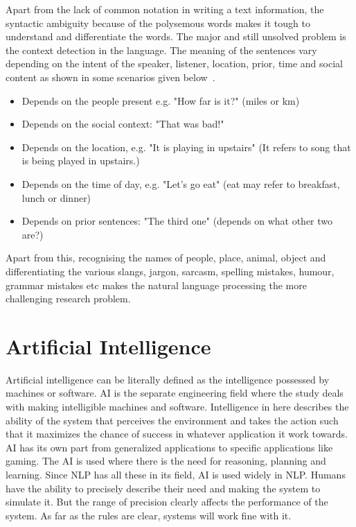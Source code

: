 \documentclass{bmcart}
\begin{document}
Apart from the lack of common notation in writing a text information, the syntactic ambiguity because of the polysemous words makes it tough to understand and differentiate the words. The major and still unsolved problem is the context detection in the language. The meaning of the sentences vary depending on the intent of the speaker, listener, location, prior, time and social content as shown in some scenarios given below~\cite{nlpHard}.

\begin{itemize}
\item     Depends on the people present e.g. "How far is it?" (miles or km)
\item     Depends on the social context: "That was bad!"
\item    Depends on the location, e.g. "It is playing in upstairs" (It refers to song that is being played in upstairs.)
\item     Depends on the time of day, e.g. "Let's go eat" (eat may refer to breakfast, lunch or dinner)
\item     Depends on prior sentences: "The third one" (depends on what other two are?)
\end{itemize}

Apart from this, recognising the names of people, place, animal, object and differentiating the various slangs, jargon, sarcasm, spelling mistakes, humour, grammar mistakes etc makes the natural language processing the more challenging research problem. 

\section{Artificial Intelligence}
\label{sec:AI}
Artificial intelligence can be literally defined as the intelligence possessed by machines or software. 	AI is the separate engineering field where the study deals with making intelligible machines and software. Intelligence in here describes the ability of the system that perceives the environment and takes the action such that it maximizes the chance of success in whatever application it work towards. AI has its own part from generalized applications to specific applications like gaming. The AI is used where there is the need for reasoning, planning and learning. Since NLP has all these in its field, AI is used widely in NLP. Humans have the ability to precisely describe their need and making the system to simulate it. But the range of precision clearly affects the performance of the system. As far as the rules are clear, systems will work fine with it.
\end{document}
